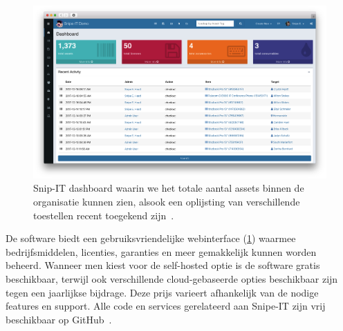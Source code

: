 \begin{figure}[h!]
    \includegraphics[width=\textwidth]
    {./graphics/state-of-the-art/snipe-dashboard.png}
    \caption{\label{fig:snipe-it-dashboard}Snip-IT dashboard waarin we het totale aantal assets binnen de organisatie kunnen zien, alsook een oplijsting van verschillende toestellen recent toegekend zijn~\autocite{snipe-it-dashboard}.}
\end{figure}

De software biedt een gebruiksvriendelijke webinterface (\ref{fig:snipe-it-dashboard}) waarmee bedrijfsmiddelen, licenties, garanties en meer gemakkelijk kunnen worden beheerd.
Wanneer men kiest voor de self-hosted optie is de software gratis beschikbaar, terwijl ook verschillende cloud-gebaseerde opties beschikbaar zijn tegen een jaarlijkse bijdrage.
Deze prijs varieert afhankelijk van de nodige features en support.
Alle code en services gerelateerd aan Snipe-IT zijn vrij beschikbaar op GitHub~\autocite{snipe-it-github}.

